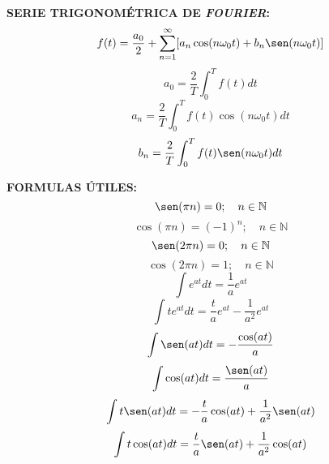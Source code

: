 \documentclass[letter,twoside,8pt]{article}
\begin{document}
\textbf{SERIE TRIGONOMÉTRICA DE \emph{FOURIER}:}
\begin{equation*}
    f(t)=\frac{a_0}{2}+\sum_{n=1}^{\infty}[a_n\cos(n{\omega_0}t)+b_n\sen(n{\omega_0}t)]
\end{equation*}
\begin{equation*}
    a_0=\frac{2}{T}\int_{0}^{T}f(t){dt}
\end{equation*}
\begin{equation*}
    a_n=\frac{2}{T}\int_{0}^{T}f(t)\cos(n{\omega_0}t){dt}
\end{equation*}
\begin{equation*}
    b_n=\frac{2}{T}\int_{0}^{T}f(t)\sen(n{\omega_0}t){dt}
\end{equation*}

\textbf{FORMULAS ÚTILES:}
\begin{equation*}
    \sen({\pi}n)=0;\quad{n}\in\mathbb{N}
\end{equation*}
\begin{equation*}
    \cos({\pi}n)={(-1)}^n;\quad{n}\in\mathbb{N}
\end{equation*}
\begin{equation*}
    \sen({2\pi}n)=0;\quad{n}\in\mathbb{N}
\end{equation*}
\begin{equation*}
    \cos({2\pi}n)=1;\quad{n}\in\mathbb{N}
\end{equation*}
\begin{equation*}
    \int{e}^{at}{dt}=\frac{1}{a}e^{at}
\end{equation*}
\begin{equation*}
    \int{t}{e}^{at}{dt}=\frac{t}{a}{e}^{at}-\frac{1}{a^2}{e}^{at}
\end{equation*}
\begin{equation*}
    \int\sen(at){dt}=-\frac{\cos(at)}{a}
\end{equation*}
\begin{equation*}
    \int\cos(at){dt}=\frac{\sen(at)}{a}
\end{equation*}
\begin{equation*}
    \int{t}\sen(at){dt}=-\frac{t}{a}\cos(at)+\frac{1}{a^2}\sen(at)
\end{equation*}
\begin{equation*}
    \int{t}\cos(at){dt}=\frac{t}{a}\sen(at)+\frac{1}{a^2}\cos(at)
\end{equation*}
\end{document}
